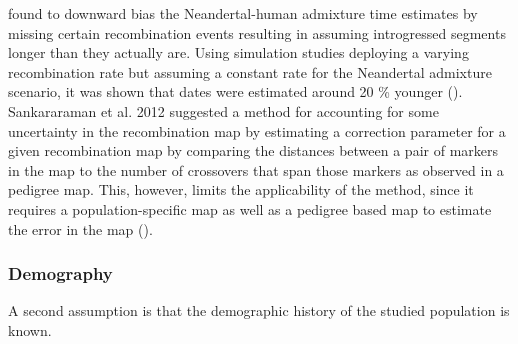 \documentclass[]{article}
\begin{document}
found to downward bias the Neandertal-human admixture time estimates by
missing certain recombination events resulting in assuming introgressed
segments longer than they actually are. Using simulation studies
deploying a varying recombination rate but assuming a constant rate for
the Neandertal admixture scenario, it was shown that dates were
estimated around 20 \% younger (\cite{sankararaman_date_2012}).
Sankararaman et al. 2012 suggested a method for accounting for some
uncertainty in the recombination map by estimating a correction
parameter for a given recombination map by comparing the distances
between a pair of markers in the map to the number of crossovers that
span those markers as observed in a pedigree map. This, however, limits
the applicability of the method, since it requires a population-specific
map as well as a pedigree based map to estimate the error in the map
(\cite{sankararaman_date_2012,fu_genome_2014,sankararaman_combined_2016,moorjani_genetic_2016}).

\subsubsection{Demography}\label{demography}

A second assumption is that the demographic history of the studied
population is known.
\end{document}
